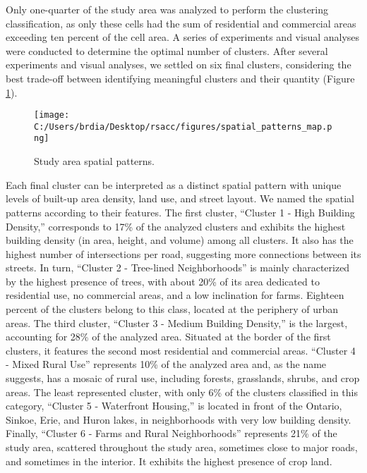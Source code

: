 \documentclass[conference,final,]{IEEEtran}
\begin{document}
Only one-quarter of the study area was analyzed to perform the
clustering classification, as only these cells had the sum of
residential and commercial areas exceeding ten percent of the cell area.
A series of experiments and visual analyses were conducted to determine
the optimal number of clusters. After several experiments and visual
analyses, we settled on six final clusters, considering the best
trade-off between identifying meaningful clusters and their quantity
(Figure \ref{fig:clusters_map}).

\begin{figure}[!bt]
\centering
\texttt{[image: C:/Users/brdia/Desktop/rsacc/figures/spatial\_patterns\_map.png]}
\caption{Study area spatial patterns.}
\label{fig:clusters_map}
\end{figure}

Each final cluster can be interpreted as a distinct spatial pattern with
unique levels of built-up area density, land use, and street layout. We
named the spatial patterns according to their features. The first
cluster, ``Cluster 1 - High Building Density,'' corresponds to 17\% of
the analyzed clusters and exhibits the highest building density (in
area, height, and volume) among all clusters. It also has the highest
number of intersections per road, suggesting more connections between
its streets. In turn, ``Cluster 2 - Tree-lined Neighborhoods'' is mainly
characterized by the highest presence of trees, with about 20\% of its
area dedicated to residential use, no commercial areas, and a low
inclination for farms. Eighteen percent of the clusters belong to this
class, located at the periphery of urban areas. The third cluster,
``Cluster 3 - Medium Building Density,'' is the largest, accounting for
28\% of the analyzed area. Situated at the border of the first clusters,
it features the second most residential and commercial areas. ``Cluster
4 - Mixed Rural Use'' represents 10\% of the analyzed area and, as the
name suggests, has a mosaic of rural use, including forests, grasslands,
shrubs, and crop areas. The least represented cluster, with only 6\% of
the clusters classified in this category, ``Cluster 5 - Waterfront
Housing,'' is located in front of the Ontario, Sinkoe, Erie, and Huron
lakes, in neighborhoods with very low building density. Finally,
``Cluster 6 - Farms and Rural Neighborhoods'' represents 21\% of the
study area, scattered throughout the study area, sometimes close to
major roads, and sometimes in the interior. It exhibits the highest
presence of crop land.
\end{document}
